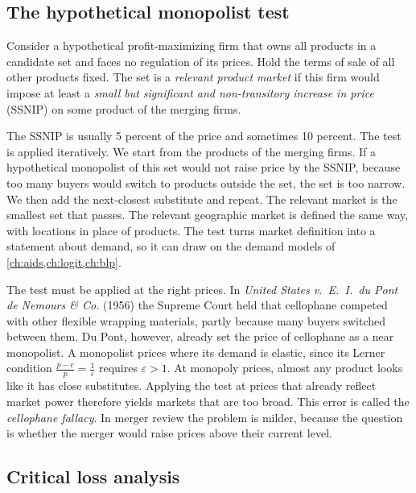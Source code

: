 \subsection{The hypothetical monopolist test}\label{sec:11-hmt}

\begin{definition}\label{def:11-hmt}
Consider a hypothetical profit-maximizing firm that owns all products in a candidate set and faces no
regulation of its prices. Hold the terms of sale of all other products fixed. The set is a \emph{relevant product
market} if this firm would impose at least a \emph{small but significant and non-transitory increase in price}
(SSNIP) on some product of the merging firms.
\end{definition}

The SSNIP is usually 5 percent of the price and sometimes 10 percent. The test is applied iteratively. We start
from the products of the merging firms. If a hypothetical monopolist of this set would not raise price by the
SSNIP, because too many buyers would switch to products outside the set, the set is too narrow. We then add the
next-closest substitute and repeat. The relevant market is the smallest set that passes. The relevant geographic
market is defined the same way, with locations in place of products. The test turns market definition into a
statement about demand, so it can draw on the demand models of \cref{ch:aids,ch:logit,ch:blp}.

The test must be applied at the right prices. In \emph{United States v.\ E.\ I.\ du Pont de Nemours \& Co.}
(1956) the Supreme Court held that cellophane competed with other flexible wrapping materials, partly because
many buyers switched between them. Du Pont, however, already set the price of cellophane as a near monopolist. A
monopolist prices where its demand is elastic, since its Lerner condition $\frac{p - c}{p} = \frac{1}{\varepsilon}$
requires $\varepsilon > 1$. At monopoly prices, almost any product looks like it has close substitutes. Applying
the test at prices that already reflect market power therefore yields markets that are too broad. This error is
called the \emph{cellophane fallacy}. In merger review the problem is milder, because the question is whether the
merger would raise prices above their current level.

\subsection{Critical loss analysis}\label{sec:11-critloss}

